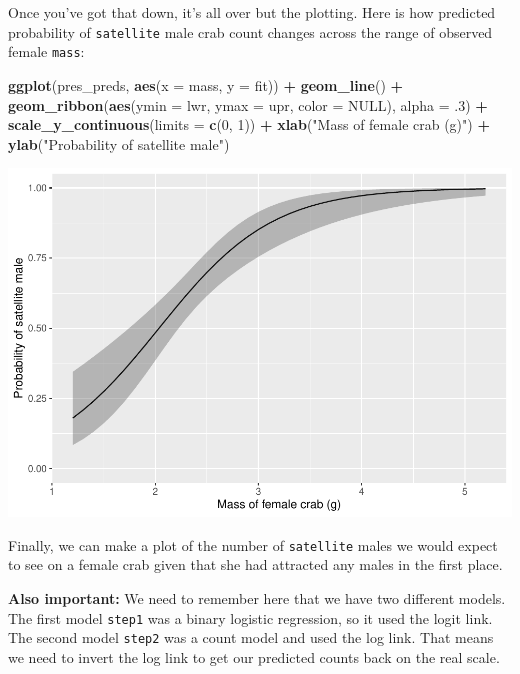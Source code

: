 \documentclass[
]{book}
\newenvironment{Shaded}{\begin{snugshade}}{\end{snugshade}}
\newcommand{\DataTypeTok}[1]{\textcolor[rgb]{0.13,0.29,0.53}{#1}}
\newcommand{\DecValTok}[1]{\textcolor[rgb]{0.00,0.00,0.81}{#1}}
\newcommand{\FloatTok}[1]{\textcolor[rgb]{0.00,0.00,0.81}{#1}}
\newcommand{\KeywordTok}[1]{\textcolor[rgb]{0.13,0.29,0.53}{\textbf{#1}}}
\newcommand{\NormalTok}[1]{#1}
\newcommand{\OperatorTok}[1]{\textcolor[rgb]{0.81,0.36,0.00}{\textbf{#1}}}
\newcommand{\OtherTok}[1]{\textcolor[rgb]{0.56,0.35,0.01}{#1}}
\newcommand{\StringTok}[1]{\textcolor[rgb]{0.31,0.60,0.02}{#1}}
\begin{document}
Once you've got that down, it's all over but the plotting. Here is how predicted probability of \texttt{satellite} male crab count changes across the range of observed female \texttt{mass}:

\begin{Shaded}
\begin{Highlighting}[]
\KeywordTok{ggplot}\NormalTok{(pres_preds, }\KeywordTok{aes}\NormalTok{(}\DataTypeTok{x =}\NormalTok{ mass, }\DataTypeTok{y =}\NormalTok{ fit)) }\OperatorTok{+}
\StringTok{  }\KeywordTok{geom_line}\NormalTok{() }\OperatorTok{+}
\StringTok{  }\KeywordTok{geom_ribbon}\NormalTok{(}\KeywordTok{aes}\NormalTok{(}\DataTypeTok{ymin =}\NormalTok{ lwr, }\DataTypeTok{ymax =}\NormalTok{ upr, }\DataTypeTok{color =} \OtherTok{NULL}\NormalTok{), }\DataTypeTok{alpha =} \FloatTok{.3}\NormalTok{) }\OperatorTok{+}
\StringTok{  }\KeywordTok{scale_y_continuous}\NormalTok{(}\DataTypeTok{limits =} \KeywordTok{c}\NormalTok{(}\DecValTok{0}\NormalTok{, }\DecValTok{1}\NormalTok{)) }\OperatorTok{+}
\StringTok{  }\KeywordTok{xlab}\NormalTok{(}\StringTok{"Mass of female crab (g)"}\NormalTok{) }\OperatorTok{+}
\StringTok{  }\KeywordTok{ylab}\NormalTok{(}\StringTok{"Probability of satellite male"}\NormalTok{)}
\end{Highlighting}
\end{Shaded}

\includegraphics{worstr_files/figure-latex/unnamed-chunk-364-1.pdf}

Finally, we can make a plot of the number of \texttt{satellite} males we would expect to see on a female crab given that she had attracted any males in the first place.

\textbf{Also important:} We need to remember here that we have two different models. The first model \texttt{step1} was a binary logistic regression, so it used the logit link. The second model \texttt{step2} was a count model and used the log link. That means we need to invert the log link to get our predicted counts back on the real scale.
\end{document}
